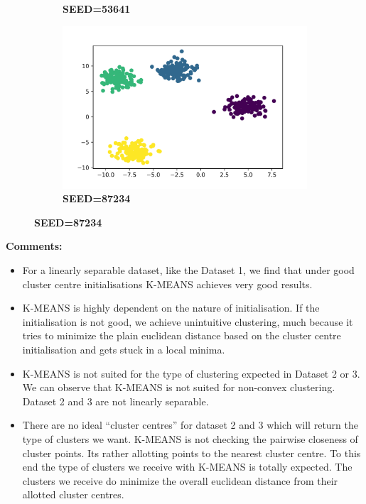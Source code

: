 \documentclass[11pt]{article}
\begin{document}
\begin{figure}[htbp!]
\begin{subfigure}{0.33\linewidth}
        \caption{\textbf{SEED=53641}}
    \end{subfigure}%
    \begin{subfigure}{0.33\linewidth}
        \centering
        \includegraphics[width=1\linewidth]{d1_87234.png}
        \caption{\textbf{SEED=87234}}
    \end{subfigure}    
\end{figure}

{\Large \textbf{Comments: }} 
\begin{itemize}
    \item For a linearly separable dataset, like the Dataset 1, we find that under good cluster centre initialisations K-MEANS achieves very good results.
    
    \item K-MEANS is highly dependent on the nature of initialisation. If the initialisation is not good, we achieve unintuitive clustering, much because it tries to minimize the plain euclidean distance based on the cluster centre initialisation and gets stuck in a local minima.
    
    \item K-MEANS is not suited for the type of clustering expected in Dataset 2 or 3. We can observe that K-MEANS is not suited for non-convex clustering. Dataset 2 and 3 are not linearly separable. 
    
    \item There are no ideal ``cluster centres'' for dataset 2 and 3 which will return the type of clusters we want. K-MEANS is not checking the pairwise closeness of cluster points. Its rather allotting points to the nearest cluster centre. To this end the type of clusters we receive with K-MEANS is totally expected. The clusters we receive do minimize the overall euclidean distance from their allotted cluster centres.
\end{itemize}
\end{document}
